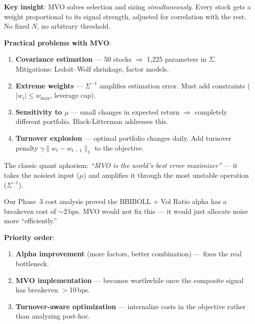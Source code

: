 \documentclass[a4paper, 11pt]{report}
\theoremstyle{definition}
\theoremstyle{remark}
\begin{document}
\begin{description}[style=nextline, leftmargin=1.8cm]
        \medskip
        \textbf{Key insight}: MVO solves selection and sizing
        \emph{simultaneously}.  Every stock gets a weight proportional
        to its signal strength, adjusted for correlation with the rest.
        No fixed $N$, no arbitrary threshold.

        \medskip
        \textbf{Practical problems with MVO}:
        \begin{enumerate}[nosep]
            \item \textbf{Covariance estimation} --- 50 stocks
                  $\Rightarrow$ 1,225 parameters in $\Sigma$.
                  Mitigations: Ledoit--Wolf shrinkage, factor models.
            \item \textbf{Extreme weights} --- $\Sigma^{-1}$ amplifies
                  estimation error.  Must add constraints
                  ($|w_i| \leq w_{\max}$, leverage cap).
            \item \textbf{Sensitivity to $\mu$} --- small changes in
                  expected return $\Rightarrow$ completely different
                  portfolio.  Black-Litterman addresses this.
            \item \textbf{Turnover explosion} --- optimal portfolio
                  changes daily.  Add turnover penalty
                  $\gamma \|w_t - w_{t-1}\|_1$ to the objective.
        \end{enumerate}

        \medskip
        The classic quant aphorism: \emph{``MVO is the world's best
        error maximizer''} --- it takes the noisiest input ($\mu$) and
        amplifies it through the most unstable operation ($\Sigma^{-1}$).

    \item[What This Means for Our Project]
        Our Phase~3 cost analysis proved the BBIBOLL + Vol Ratio alpha
        has a breakeven cost of $\sim$2\,bps.  MVO would not fix this
        --- it would just allocate noise more ``efficiently.''

        \medskip
        \textbf{Priority order}:
        \begin{enumerate}[nosep]
            \item \textbf{Alpha improvement} (more factors, better
                  combination) --- fixes the real bottleneck.
            \item \textbf{MVO implementation} --- becomes worthwhile
                  once the composite signal has breakeven $>$10\,bps.
            \item \textbf{Turnover-aware optimization} --- internalize
                  costs in the objective rather than analyzing post-hoc.
        \end{enumerate}


\end{description}
\end{document}
